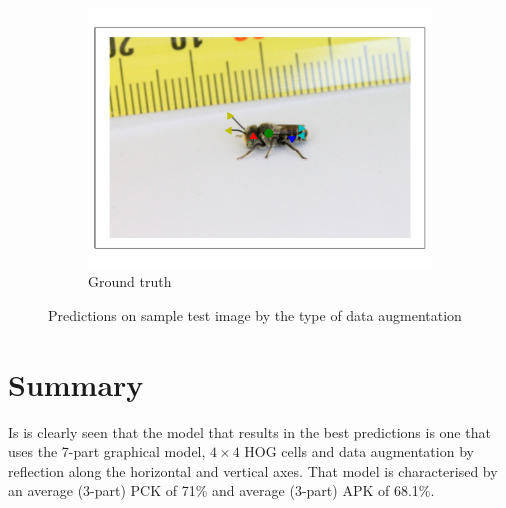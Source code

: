 \documentclass[11pt, oneside]{report}
\begin{document}
\begin{figure}[p]
\begin{subfigure}[b]{0.45\textwidth}
                \centering
                \includegraphics[width=\textwidth]{7pgt_3.pdf}
                \caption{Ground truth}
            \end{subfigure}
            \hspace{0.1\textwidth}\hspace{0.1\textwidth}
            \caption{Predictions on sample test image by the type of data augmentation}
            \label{fig:aug_vis3}
        \end{figure}

    \section{Summary}
        Is is clearly seen that the model that results in the best predictions is one that uses the 7-part graphical model, $4\times4$ HOG cells and data augmentation by reflection along the horizontal and vertical axes. That model is characterised by an average (3-part) PCK of 71\% and average (3-part) APK of 68.1\%.
\end{document}
